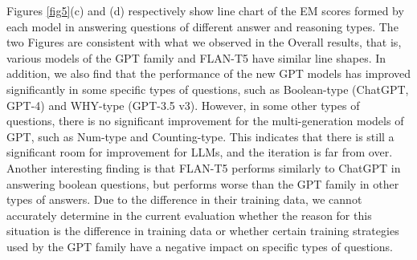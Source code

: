 \documentclass[runningheads]{llncs}
\begin{document}
Figures \ref{fig5}(c) and (d) respectively show line chart of the EM scores formed by each model in answering questions of different answer and reasoning types. The two Figures are consistent with what we observed in the Overall results, that is, various models of the GPT family and FLAN-T5 have similar line shapes. In addition, we also find that the performance of the new GPT models has improved significantly in some specific types of questions, such as Boolean-type (ChatGPT, GPT-4) and WHY-type (GPT-3.5 v3). However, in some other types of questions, there is no significant improvement for the multi-generation models of GPT, such as Num-type and Counting-type. This indicates that there is still a significant room for improvement for LLMs, and the iteration is far from over. Another interesting finding is that FLAN-T5 performs similarly to ChatGPT in answering boolean questions, but performs worse than the GPT family in other types of answers. Due to the difference in their training data, we cannot accurately determine in the current evaluation whether the reason for this situation is the difference in training data or whether certain training strategies used by the GPT family have a negative impact on specific types of questions.















\begin{table}\centering
\caption{MFT results of ChatGPT} \label{tab5}
\end{table}
\end{document}
